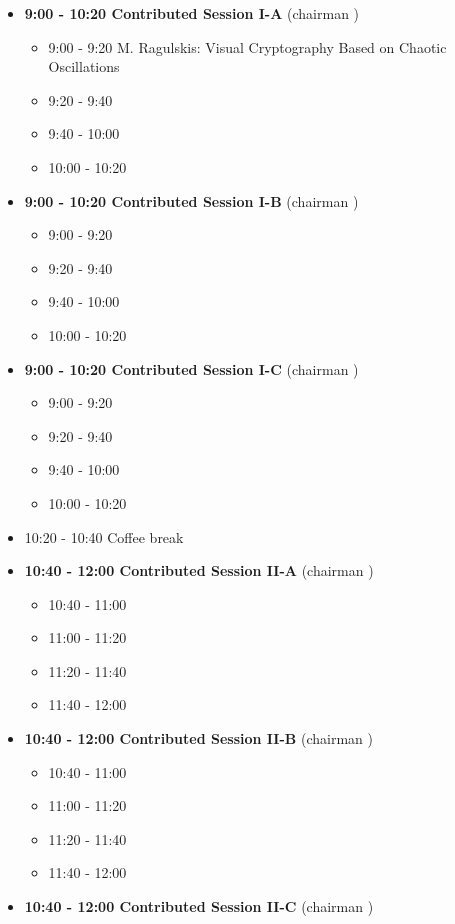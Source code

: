 \documentclass[10pt, A4]{article}%
\begin{document}
\begin{itemize}    
  \item {\bf 9:00 - 10:20 Contributed Session I-A} (chairman ) 
  \begin{itemize}
    \item 9:00 - 9:20 {M. Ragulskis}: {Visual Cryptography Based on Chaotic Oscillations}
    \item 9:20 - 9:40 
    \item 9:40 - 10:00 
    \item 10:00 - 10:20  
  \end{itemize}
  \item {\bf 9:00 - 10:20 Contributed Session I-B} (chairman ) 
  \begin{itemize}
    \item 9:00 - 9:20 
    \item 9:20 - 9:40 
    \item 9:40 - 10:00 
    \item 10:00 - 10:20      
  \end{itemize}
    \item {\bf 9:00 - 10:20 Contributed Session I-C} (chairman ) 
  \begin{itemize}
    \item 9:00 - 9:20 
    \item 9:20 - 9:40 
    \item 9:40 - 10:00 
    \item 10:00 - 10:20      
  \end{itemize}
  \item 10:20 - 10:40 Coffee break
  \item {\bf 10:40 - 12:00 Contributed Session II-A} (chairman ) 
  \begin{itemize}
    \item 10:40 - 11:00
    \item 11:00 - 11:20 
    \item 11:20 - 11:40 
    \item 11:40 - 12:00 
  \end{itemize}
  \item {\bf 10:40 - 12:00 Contributed Session II-B} (chairman ) 
  \begin{itemize}
    \item 10:40 - 11:00
    \item 11:00 - 11:20 
    \item 11:20 - 11:40 
    \item 11:40 - 12:00  
  \end{itemize}
  \item {\bf 10:40 - 12:00 Contributed Session II-C} (chairman ) 

\end{itemize}
\end{document}
